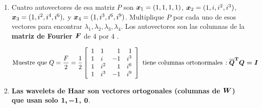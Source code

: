 \documentclass[12pt,a4paper]{article}
\newcommand{\bi}[1]{\hbox{\boldmath$#1$}}
\newcommand\1{\mbox{\,\vrule height-0.8pt depth1.0pt width2pc\,}}
\newcommand\2{\mbox{\,\vrule height-0.8pt depth1.0pt width1pc\,}}
\DeclareRobustCommand\transp{^{\mathrm{T}}}
\newcommand\bfcdot{\boldsymbol{\cdot}}
\begin{document}
\begin{enumerate}
\item Cuatro autovectores de esa matriz $P$ son $\bi{x}_1=(1,1,1,1)$, $\bi{x}_2=(1, i, i^2, i^3)$, $\bi{x}_3=(1, i^2, i^4,i^6),$ y $\bi{x}_4=(1, i^3, i^6, i^9)$. Multiplique $P$ por cada uno de esos vectores para encontrar $\lambda_1, \lambda_2, \lambda_3, \lambda_4$. Los autovectores son las columnas de la \textbf{matriz de Fourier $\bi{F}$} de $4$ por $4$ .

\vspace{-10pt}
$$
\text{Muestre que } Q=\dfrac{F}{2}=\dfrac{1}{2}\left[\begin{array}{llrr}1&1&1&1\\1&i&-1&i^3\\1&i^2&1&i^6\\1&i^3&-1&i^9\\\end{array}\right]\text{ tiene columnas ortonormales}\,:\bi{\overline{Q}\transp Q=I}
$$

%

\item {}\textbf{Las wavelets de Haar son vectores ortogonales (columnas de $\bi{W}$) que usan solo $\bi{1, -1}$, $\bi{0}$}.


\end{enumerate}
\end{document}
